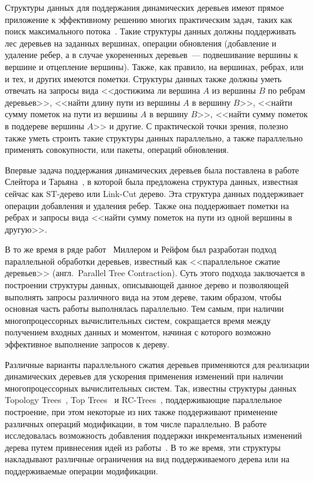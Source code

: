 \documentclass[specification,annotation,times]{itmo-student-thesis}
\begin{document}

\tableofcontents

\startprefacepage

Структуры данных для поддержания динамических деревьев имеют прямое приложение к эффективному решению многих практическим задач,
таких как поиск максимального потока~\cite{goldberg88}. Такие структуры данных должны поддерживать лес деревьев на заданных вершинах,
операции обновления (добавление и удаление ребер, а в случае укорененных деревьев~--- подвешивание вершины к вершине и отцепление вершины).
Также, как правило, на вершинах, ребрах, или и тех, и других имеются пометки. Структуры данных также должны уметь отвечать на запросы
вида <<достижима ли вершина $A$ из вершины $B$ по ребрам деревьев>>, <<найти длину пути из вершины $A$ в вершину $B$>>,
<<найти сумму пометок на пути из вершины $A$ в вершину $B$>>, <<найти сумму пометок в поддереве вершины $A$>> и другие.
С практической точки зрения, полезно также уметь строить такие структуры данных параллельно,
а также параллельно применять совокупности, или пакеты, операций обновления.

Впервые задача поддержания динамических деревьев была поставлена в работе Слейтора и Тарьяна~\cite{sleator83}, в которой была предложена
структура данных, известная сейчас как ST-дерево или Link-Cut дерево. Эта структура данных поддерживает операции добавления и удаления ребер.
Также она поддерживает пометки на ребрах и запросы вида <<найти сумму пометок на пути из одной вершины в другую>>.

В то же время в ряде работ~\cite{miller85, miller89, miller91, reif94} Миллером и Рейфом был разработан подход параллельной обработки деревьев,
известный как <<параллельное сжатие деревьев>> (англ.~Parallel Tree Contraction). Суть этого подхода заключается в построении структуры данных,
описывающей данное дерево и позволяющей выполнять запросы различного вида на этом дереве, таким образом, чтобы основная часть работы выполнялась
параллельно. Тем самым, при наличии многопроцессорных вычислительных систем, сокращается время между получением входных данных и моментом, начиная
с которого возможно эффективное выполнение запросов к дереву.

Различные варианты параллельного сжатия деревьев применяются для реализации динамических деревьев для ускорения применения изменений при наличии
многопроцессорных вычислительных систем. Так, известны структуры данных Topology Trees~\cite{frederickson97}, Top Trees~\cite{alstrup05} и RC-Trees~\cite{acar03},
поддерживающие параллельное построение, при этом 
некоторые из них также поддерживают применение различных операций модификации, в том числе параллельно. 
В работе~\cite{acar04} исследовалась возможность добавления поддержки инкрементальных изменений дерева путем привнесения идей
из работы~\cite{miller85}. В то же время, эти структуры накладывают различные ограничения на вид поддерживаемого дерева или на поддерживаемые операции модификации.
\end{document}
